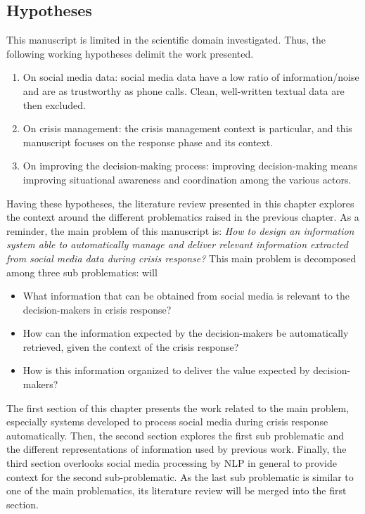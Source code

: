 \subsection*{Hypotheses}
This manuscript is limited in the scientific domain investigated.
Thus, the following working hypotheses delimit the work presented.

\begin{enumerate}
    \item On social media data: social media data have a low ratio of information/noise and are as trustworthy as phone calls.
          Clean, well-written textual data are then excluded.
    \item On crisis management: the crisis management context is particular, and this manuscript focuses on the response phase and its context.
    \item On improving the decision-making process: improving decision-making means improving situational awareness and coordination among the various actors.
\end{enumerate}

Having these hypotheses, the literature review presented in this chapter explores the context around the different problematics raised in the previous chapter.
As a reminder, the main problem of this manuscript is: \emph{How to design an information system able to automatically manage and deliver relevant information extracted from social media data during crisis response?}
This main problem is decomposed among three sub problematics:
will
\begin{itemize}
    \item What information that can be obtained from social media is relevant to the decision-makers in crisis response?
    \item How can the information expected by the decision-makers be automatically retrieved, given the context of the crisis response?
    \item How is this information organized to deliver the value expected by decision-makers?
\end{itemize}

The first section of this chapter presents the work related to the main problem, especially systems developed to process social media during crisis response automatically.
Then, the second section explores the first sub problematic and the different representations of information used by previous work.
Finally, the third section overlooks social media processing by NLP in general to provide context for the second sub-problematic.
As the last sub problematic is similar to one of the main problematics, its literature review will be merged into the first section.

